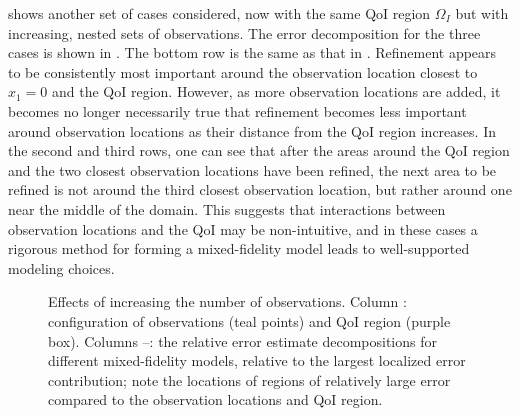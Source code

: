 shows another set of cases considered, now with the same QoI region $\Omega_I$ but with increasing, nested sets of observations.
The error decomposition for the three cases is shown in . The bottom row is the same as that in . Refinement appears to be consistently most important around the observation location closest to $x_1=0$ and the QoI region. However, as more observation locations are added, it becomes no longer necessarily true that refinement becomes less important around observation locations as their distance from the QoI region increases. In the second and third rows, one can see that after the areas around the QoI region and the two closest observation locations have been refined, the next area to be refined is not around the third closest observation location, but rather around one near the middle of the domain. This suggests that interactions between observation locations and the QoI may be non-intuitive, and in these cases a rigorous method for forming a mixed-fidelity model leads to well-supported modeling choices.

\begin{figure}[htbp]
\centering
\captionsetup{justification=centering}
\captionsetup{justification=centering}
\captionsetup{justification=centering}
\captionsetup{justification=centering}
  \caption{Effects of increasing the number of observations. Column \protect{}: configuration of observations (teal points) and QoI region (purple box). Columns \protect{}--\protect{}: the relative error estimate decompositions for different mixed-fidelity models, relative to the largest localized error contribution; note the locations of regions of relatively large error compared to the observation locations and QoI region.}
  \label{fig:dataStudy}
\end{figure}

